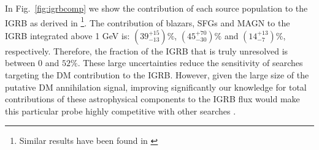\documentclass[12 pt]{article}
\newcommand{\FIXME}[1]{{\color{red}{\em Comment: }{#1}}}
\begin{document}
In Fig.~\ref{fig:igrbcomp} we show the contribution of each source population to the IGRB as derived in \cite{DiMauro:2015tfa}\footnote{Similar results have been found in \cite{Ajello:2015mfa}}.
The contribution of blazars, SFGs and MAGN to the IGRB integrated above 1 GeV is: $(39^{+15}_{-13})\%$, $(45^{+70}_{-30})\%$ and $(14^{+13}_{-7})\%$, respectively. 
Therefore, the fraction of the IGRB that is truly unresolved is between $0$ and $52\%$.
These large uncertainties reduce the sensitivity of searches targeting the DM contribution to the IGRB.
However, given the large size of the putative DM annihilation signal, improving significantly our knowledge for total contributions of these astrophysical components to the IGRB flux would make this particular probe highly competitive with other searches \cite{Charles:2016pgz}. 
\end{document}
